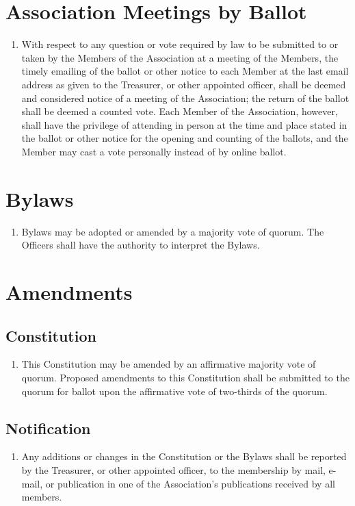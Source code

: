 \section{Association Meetings by Ballot}
\begin{enumerate}
	\item With respect to any question or vote required by law to be submitted to or taken by the Members of the Association at a meeting of the Members, the timely emailing of the ballot or other notice to each Member at the last email address as given to the Treasurer, or other appointed officer, shall be deemed and considered notice of a meeting of the Association; the return of the ballot shall be deemed a counted vote. Each Member of the Association, however, shall have the privilege of attending in person at the time and place stated in the ballot or other notice for the opening and counting of the ballots, and the Member may cast a vote personally instead of by online ballot.
\end{enumerate}

\section{Bylaws}
\begin{enumerate}
	\item Bylaws may be adopted or amended by a majority vote of quorum. The Officers shall have the authority to interpret the Bylaws.
\end{enumerate}

\section{Amendments}

\subsection{Constitution}
\begin{enumerate}
	\item This Constitution may be amended by an affirmative majority vote of quorum. Proposed amendments to this Constitution shall be submitted to the quorum for ballot upon the affirmative vote of two-thirds of the quorum.
\end{enumerate}

\subsection{Notification}
\begin{enumerate}
	\item Any additions or changes in the Constitution or the Bylaws shall be reported by the Treasurer, or other appointed officer, to the membership by mail, e-mail, or publication in one of the Association's publications received by all members.
\end{enumerate}


